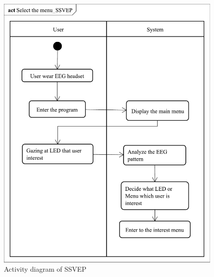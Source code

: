 \begin{figure}[ht]
\centering \includegraphics[scale=0.31]{chapter4/av_SSVEP.pdf}
\caption{Activity diagram of SSVEP}
\end{figure}

